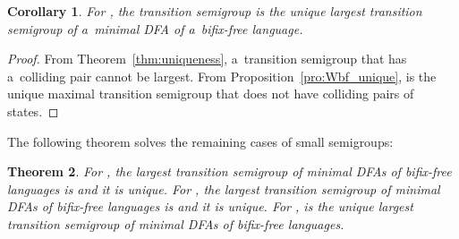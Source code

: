 \documentclass{amsart}
\newtheorem{theorem}{Theorem}
\newtheorem{corollary}[theorem]{Corollary}
\begin{document}
\begin{corollary}
For , the transition semigroup  is the unique largest transition semigroup of a~minimal DFA of a~bifix-free language.
\end{corollary}
\begin{proof}
From Theorem~\ref{thm:uniqueness}, a~transition semigroup that has a~colliding pair cannot be largest.
From Proposition~\ref{pro:Wbf_unique},  is the unique maximal transition semigroup that does not have colliding pairs of states.
\end{proof}

The following theorem solves the remaining cases of small semigroups:
\begin{theorem}
For , the largest transition semigroup of minimal DFAs of bifix-free languages is  and it is unique.
For , the largest transition semigroup of minimal DFAs of bifix-free languages is  and it is unique.
For ,  is the unique largest transition semigroup of minimal DFAs of bifix-free languages.
\end{theorem}
\end{document}
